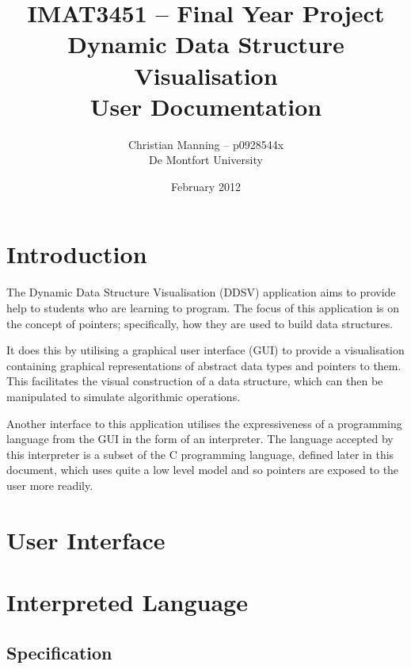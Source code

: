 \documentclass{article}
\author{Christian Manning -- p0928544x\\
De Montfort University}
\title{IMAT3451 -- Final Year Project\\
    Dynamic Data Structure Visualisation\\
    User Documentation
}
\date{February 2012}
\begin{document}
\maketitle

\tableofcontents

\pagebreak

\section{Introduction}

The Dynamic Data Structure Visualisation (DDSV) application aims to provide help to students who are learning to program. The focus of this application is on the concept of pointers; specifically, how they are used to build data structures.

It does this by utilising a graphical user interface (GUI) to provide a visualisation containing graphical representations of abstract data types and pointers to them. This facilitates the visual construction of a data structure, which can then be manipulated to simulate algorithmic operations.

Another interface to this application utilises the expressiveness of a programming language from the GUI in the form of an interpreter. The language accepted by this interpreter is a subset of the C programming language, defined later in this document, which uses quite a low level model and so pointers are exposed to the user more readily.

\section{User Interface}

\section{Interpreted Language}

\subsection{Specification}
\end{document}
